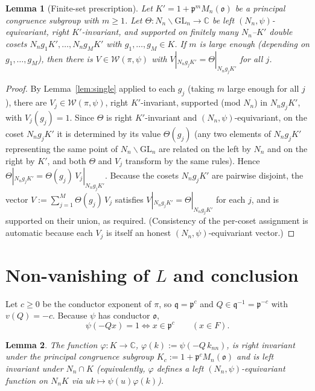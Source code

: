 \documentclass[12pt]{article}
\newcommand{\GL}{\mathrm{GL}}
\newcommand{\oo}{\mathfrak{o}}
\newcommand{\pp}{\mathfrak{p}}
\newcommand{\qq}{\mathfrak{q}}
\newcommand{\Wmod}{\mathcal{W}}
\newtheorem{lemma}{Lemma}
\begin{document}
\begin{lemma}[Finite-set prescription]\label{lem:finite}
Let $K'=1+\pp^{m}M_n(\oo)$ be a principal congruence subgroup with $m\ge1$. Let
$\Theta:N_n\backslash\GL_n\to\mathbb C$ be left $(N_n,\psi)$-equivariant, right
$K'$-invariant, and supported on finitely many $N_n$--$K'$ double cosets
$N_n g_1 K',\dots,N_n g_M K'$ with $g_1,\dots,g_M\in K$. If $m$ is large enough
(depending on $g_1,\dots,g_M$), then there is $V\in\Wmod(\pi,\psi)$ with
$V|_{N_n g_j K'}=\Theta|_{N_n g_j K'}$ for all $j$.
\end{lemma}

\begin{proof}
By Lemma~\ref{lem:single} applied to each $g_j$ (taking $m$ large enough for all
$j$), there are $V_j\in\Wmod(\pi,\psi)$, right $K'$-invariant, supported (mod $N_n$)
in $N_n g_j K'$, with $V_j(g_j)=1$. Since $\Theta$ is right $K'$-invariant and
$(N_n,\psi)$-equivariant, on the coset $N_n g_j K'$ it is determined by its value
$\Theta(g_j)$ (any two elements of $N_n g_j K'$ representing the same point of
$N_n\backslash\GL_n$ are related on the left by $N_n$ and on the right by $K'$, and
both $\Theta$ and $V_j$ transform by the same rules). Hence
$\Theta|_{N_n g_j K'}=\Theta(g_j)\,V_j|_{N_n g_j K'}$. Because the cosets
$N_n g_j K'$ are pairwise disjoint, the vector $V:=\sum_{j=1}^{M}\Theta(g_j)\,V_j$
satisfies $V|_{N_n g_j K'}=\Theta|_{N_n g_j K'}$ for each $j$, and is supported on
their union, as required. (Consistency of the per-coset assignment is automatic
because each $V_j$ is itself an honest $(N_n,\psi)$-equivariant vector.)
\end{proof}

\section{Non-vanishing of $L$ and conclusion}

Let $c\ge0$ be the conductor exponent of $\pi$, so $\qq=\pp^{c}$ and
$Q\in\qq^{-1}=\pp^{-c}$ with $v(Q)=-c$. Because $\psi$ has conductor $\oo$,
\begin{equation}\label{eq:cond}
  \psi(-Qx)=1\iff x\in\pp^{c}\qquad(x\in F).
\end{equation}

\begin{lemma}\label{lem:phi}
The function $\varphi:K\to\mathbb C$, $\varphi(k):=\psi(-Q\,k_{nn})$, is right
invariant under the principal congruence subgroup $K_c:=1+\pp^{c}M_n(\oo)$ and is
left invariant under $N_n\cap K$ (equivalently, $\varphi$ defines a left
$(N_n,\psi)$-equivariant function on $N_nK$ via $uk\mapsto\psi(u)\varphi(k)$).
\end{lemma}
\end{document}
